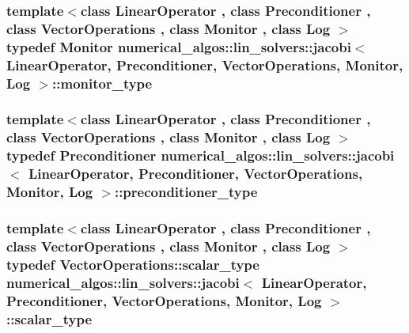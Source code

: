 \hypertarget{classnumerical__algos_1_1lin__solvers_1_1jacobi_a62ed1ba2b2ed62bbe1fc38911770d59a}{
\subsubsection[{monitor\-\_\-type}]{\setlength{\rightskip}{0pt plus 5cm}template$<$class Linear\-Operator , class Preconditioner , class Vector\-Operations , class Monitor , class Log $>$ typedef Monitor {\bf numerical\-\_\-algos\-::lin\-\_\-solvers\-::jacobi}$<$ Linear\-Operator, Preconditioner, Vector\-Operations, Monitor, Log $>$\-::{\bf monitor\-\_\-type}}}\label{classnumerical__algos_1_1lin__solvers_1_1jacobi_a62ed1ba2b2ed62bbe1fc38911770d59a}
\hypertarget{classnumerical__algos_1_1lin__solvers_1_1jacobi_acc0f0bdcc2f122409be20961a7144178}{
\subsubsection[{preconditioner\-\_\-type}]{\setlength{\rightskip}{0pt plus 5cm}template$<$class Linear\-Operator , class Preconditioner , class Vector\-Operations , class Monitor , class Log $>$ typedef Preconditioner {\bf numerical\-\_\-algos\-::lin\-\_\-solvers\-::jacobi}$<$ Linear\-Operator, Preconditioner, Vector\-Operations, Monitor, Log $>$\-::{\bf preconditioner\-\_\-type}}}\label{classnumerical__algos_1_1lin__solvers_1_1jacobi_acc0f0bdcc2f122409be20961a7144178}
\hypertarget{classnumerical__algos_1_1lin__solvers_1_1jacobi_aec612c61c39f98f8ed15c8c047d0ac6f}{
\subsubsection[{scalar\-\_\-type}]{\setlength{\rightskip}{0pt plus 5cm}template$<$class Linear\-Operator , class Preconditioner , class Vector\-Operations , class Monitor , class Log $>$ typedef Vector\-Operations\-::scalar\-\_\-type {\bf numerical\-\_\-algos\-::lin\-\_\-solvers\-::jacobi}$<$ Linear\-Operator, Preconditioner, Vector\-Operations, Monitor, Log $>$\-::{\bf scalar\-\_\-type}}}\label{classnumerical__algos_1_1lin__solvers_1_1jacobi_aec612c61c39f98f8ed15c8c047d0ac6f}

